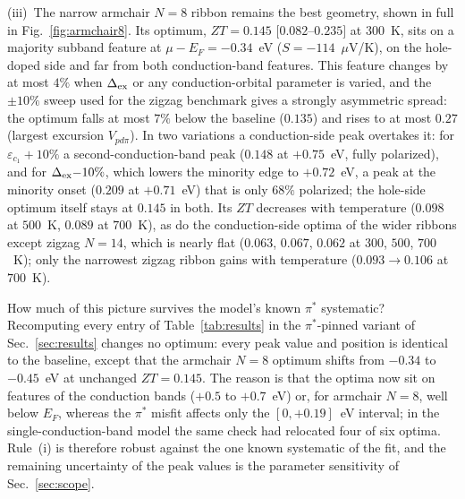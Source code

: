 \documentclass[preprint,12pt]{elsarticle}
\begin{document}
(iii)~The narrow armchair $N=8$ ribbon remains the best geometry, shown in full in
Fig.~\ref{fig:armchair8}. Its optimum, $ZT=0.145$ $[0.082$--$0.235]$ at $300$~K, sits on a
majority subband feature at $\mu-E_F=-0.34$~eV ($S=-114$~$\mu$V/K), on the hole-doped side
and far from both conduction-band features. This feature changes by at most $4\%$ when
$\Delta_{\rm ex}$ or any conduction-orbital parameter is varied, and the $\pm10\%$ sweep used
for the zigzag benchmark gives a strongly asymmetric spread: the optimum falls at most $7\%$
below the baseline ($0.135$) and rises to at most $0.27$ (largest excursion $V_{pd\pi}$). In
two variations a conduction-side peak overtakes it: for $\varepsilon_{c_1}{+}10\%$ a
second-conduction-band peak ($0.148$ at $+0.75$~eV, fully polarized), and for
$\Delta_{\rm ex}{-}10\%$, which lowers the minority edge to $+0.72$~eV, a peak at the minority
onset ($0.209$ at $+0.71$~eV) that is only $68\%$ polarized; the hole-side optimum itself
stays at $0.145$ in both. Its $ZT$ decreases with temperature ($0.098$ at $500$~K, $0.089$ at
$700$~K), as do the conduction-side optima of the wider ribbons except zigzag $N=14$, which is
nearly flat ($0.063$, $0.067$, $0.062$ at $300$, $500$, $700$~K); only the narrowest zigzag
ribbon gains with temperature ($0.093\to0.106$ at $700$~K).

How much of this picture survives the model's known $\pi^*$ systematic? Recomputing every
entry of Table~\ref{tab:results} in the $\pi^*$-pinned variant of Sec.~\ref{sec:results}
changes no optimum: every peak value and position is identical to the baseline, except that
the armchair $N{=}8$ optimum shifts from $-0.34$ to $-0.45$~eV at unchanged $ZT=0.145$. The
reason is that the optima now sit on features of the conduction bands ($+0.5$ to $+0.7$~eV)
or, for armchair $N=8$, well below $E_F$, whereas the $\pi^*$ misfit affects only the
$[0,+0.19]$~eV interval; in the single-conduction-band model the same check had relocated
four of six optima. Rule~(i) is therefore robust against the one known systematic of the
fit, and the remaining uncertainty of the peak values is the parameter sensitivity of
Sec.~\ref{sec:scope}.
\end{document}
